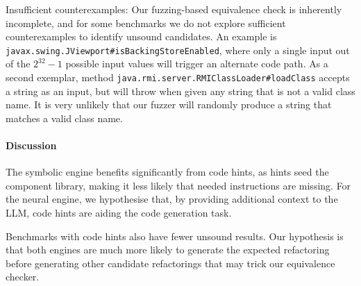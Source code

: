 \documentclass[sigconf]{acmart}
\begin{document}
Insufficient counterexamples: Our fuzzing-based equivalence check is inherently
incomplete, and for some benchmarks we do not explore sufficient counterexamples
to identify unsound candidates. An example
is \lstinline[breaklines=true]{javax.swing.JViewport#isBackingStoreEnabled}, where only a single input
out of the $2^{32}-1$ possible input values will trigger an alternate code path.
As a second exemplar, method \lstinline[breaklines=true]{java.rmi.server.RMIClassLoader#loadClass}
accepts a string as an input, but will throw when given any string
that is not a valid class name. %
It is very unlikely that our fuzzer will randomly produce a string that matches a valid class
name.

\paragraph{Discussion}

The symbolic engine benefits significantly from code hints, as hints seed
the component library, making it less likely that needed instructions are
missing.  For the neural engine, we hypothesise that, by providing
additional context to the LLM, code hints are aiding the code generation
task.

Benchmarks with code hints also have fewer unsound results.  Our hypothesis
is that both engines are much more likely to generate the expected
refactoring before generating other candidate refactorings that may trick
our equivalence checker.

%
%
%
%
\end{document}

